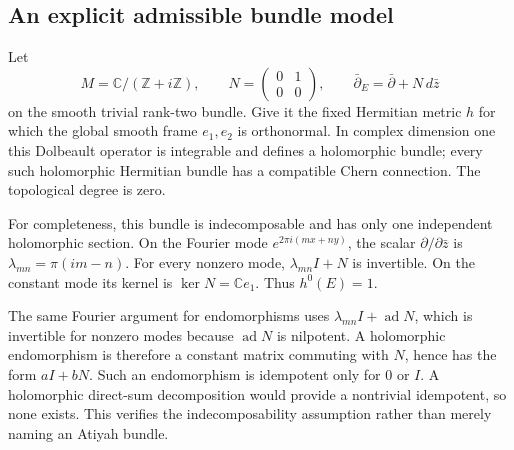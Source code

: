 \documentclass[10pt]{article}
\begin{document}
\subsection*{An explicit admissible bundle model}
Let \[M=\mathbb C/(\mathbb Z+i\mathbb Z),\qquad
N=\begin{pmatrix}0&1\\0&0\end{pmatrix},
\qquad
\bar\partial_E=\bar\partial+N\,d\bar z\] on the smooth trivial rank-two bundle. Give it the fixed Hermitian metric \(h\) for which the global smooth frame \(e_1,e_2\) is orthonormal. In complex dimension one this Dolbeault operator is integrable and defines a holomorphic bundle; every such holomorphic Hermitian bundle has a compatible Chern connection. The topological degree is zero.\par
For completeness, this bundle is indecomposable and has only one independent holomorphic section. On the Fourier mode \(e^{2\pi i(mx+ny)}\), the scalar \(\partial/\partial\bar z\) is \(\lambda_{mn}=\pi(im-n)\). For every nonzero mode, \(\lambda_{mn}I+N\) is invertible. On the constant mode its kernel is \(\ker N=\mathbb C e_1\). Thus \(h^0(E)=1\).\par
The same Fourier argument for endomorphisms uses \(\lambda_{mn}I+\operatorname{ad}N\), which is invertible for nonzero modes because \(\operatorname{ad}N\) is nilpotent. A holomorphic endomorphism is therefore a constant matrix commuting with \(N\), hence has the form \(aI+bN\). Such an endomorphism is idempotent only for \(0\) or \(I\). A holomorphic direct-sum decomposition would provide a nontrivial idempotent, so none exists. This verifies the indecomposability assumption rather than merely naming an Atiyah bundle.\par
\end{document}
